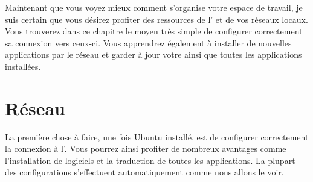  {Maintenant que vous voyez mieux}{ comment s'organise votre espace de travail, je suis certain que vous désirez profiter des ressources de l' et de vos réseaux locaux. Vous trouverez dans ce chapitre le moyen très simple de configurer correctement sa connexion vers ceux-ci. Vous apprendrez également à installer de nouvelles applications par le réseau et garder à jour votre  ainsi que toutes les applications installées.}
\section{Réseau}
\label{RefInstallReseau}
La première chose à faire, une fois Ubuntu installé, est de configurer correctement la connexion à l'. Vous pourrez ainsi profiter de nombreux avantages comme l'installation de logiciels et la traduction de toutes les applications. La plupart des configurations s'effectuent automatiquement comme nous allons le voir.
